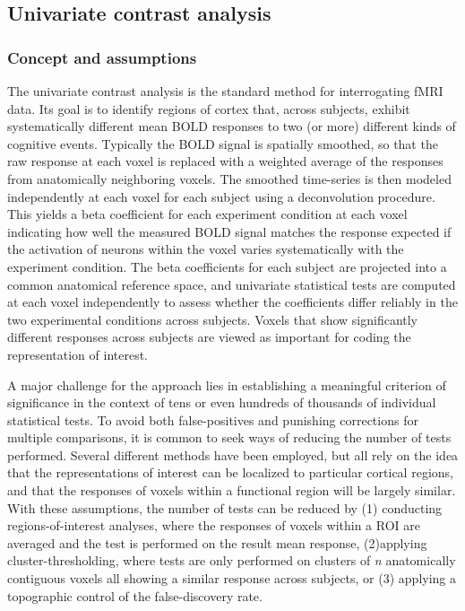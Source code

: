 \subsection{Univariate contrast analysis}
\subsubsection{Concept and assumptions} The univariate contrast analysis is the standard method for interrogating fMRI data. Its goal is to identify regions of cortex that, across subjects, exhibit systematically different mean BOLD responses to two (or more) different kinds of cognitive events. Typically the BOLD signal is spatially smoothed, so that the raw response at each voxel is replaced with a weighted average of the responses from anatomically neighboring voxels. The smoothed time-series is then modeled independently at each voxel for each subject using a deconvolution procedure. This yields a beta coefficient for each experiment condition at each voxel indicating how well the measured BOLD signal matches the response expected if the activation of neurons within the voxel varies systematically with the experiment condition. The beta coefficients for each subject are projected into a common anatomical reference space, and univariate statistical tests are computed at each voxel independently to assess whether the coefficients differ reliably in the two experimental conditions across subjects. Voxels that show significantly different responses across subjects are viewed as important for coding the representation of interest. 

A major challenge for the approach lies in establishing a meaningful criterion of significance in the context of tens or even hundreds of thousands of individual statistical tests. To avoid both false-positives and punishing corrections for multiple comparisons, it is common to seek ways of reducing the number of tests performed. Several different methods have been employed, but all rely on the idea that the representations of interest can be localized to particular cortical regions, and that the responses of voxels within a functional region will be largely similar. With these assumptions, the number of tests can be reduced by (1) conducting regions-of-interest analyses, where the responses of voxels within a ROI are averaged and the test is performed on the result mean response, (2)applying cluster-thresholding, where tests are only performed on clusters of {\em n} anatomically contiguous voxels all showing a similar response across subjects, or (3) applying a topographic control of the false-discovery rate. 
 
